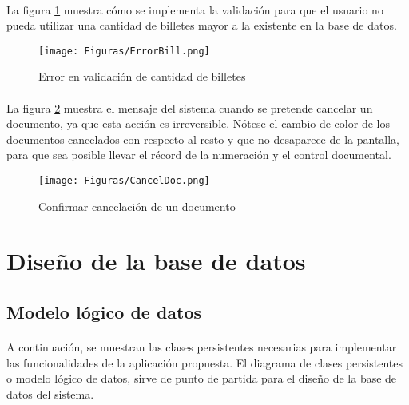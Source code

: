 \paragraph{}La figura \ref{fig:ErrorBill} muestra cómo se implementa la validación para que el usuario no pueda utilizar una cantidad de billetes mayor a la existente en la base de datos.

\begin{figure}[H] %
	\centering
	\texttt{[image: Figuras/ErrorBill.png]}
	\caption{Error en validación de cantidad de billetes}
	\label{fig:ErrorBill}
\end{figure}

\paragraph{}La figura \ref{fig:CancelDoc} muestra el mensaje del sistema cuando se pretende cancelar un documento, ya que esta acción es irreversible. Nótese el cambio de color de los documentos cancelados con respecto al resto y que no desaparece de la pantalla, para que sea posible llevar el récord de la numeración y el control documental.

\begin{figure} %
	\centering
	\texttt{[image: Figuras/CancelDoc.png]}
	\caption{Confirmar cancelación de un documento}
	\label{fig:CancelDoc}
\end{figure}

\section{Diseño de la base de datos}
\subsection{Modelo lógico de datos}
\paragraph{}A continuación, se muestran las clases persistentes necesarias para implementar las funcionalidades de la aplicación propuesta. El diagrama de clases persistentes o modelo lógico de datos, sirve de punto de partida para el diseño de la base de datos del sistema.
